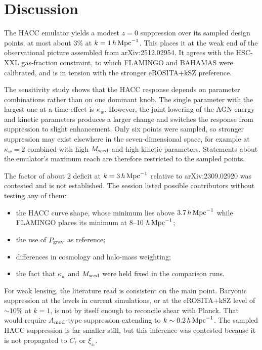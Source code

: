 \documentclass[11pt,a4paper]{article}
\begin{document}
\section{Discussion}

The HACC emulator yields a modest $z=0$ suppression over its sampled design points, at most about $3\%$ at $k=1\,h\,{\rm Mpc}^{-1}$. This places it at the weak end of the observational picture assembled from arXiv:2512.02954. It agrees with the HSC-XXL gas-fraction constraint, to which FLAMINGO and BAHAMAS were calibrated, and is in tension with the stronger eROSITA+kSZ preference.

The sensitivity study shows that the HACC response depends on parameter combinations rather than on one dominant knob. The single parameter with the largest one-at-a-time effect is $\kappa_w$. However, the joint lowering of the AGN energy and kinetic parameters produces a larger change and switches the response from suppression to slight enhancement. Only six points were sampled, so stronger suppression may exist elsewhere in the seven-dimensional space, for example at $\kappa_w=2$ combined with high $M_{\rm seed}$ and high kinetic parameters. Statements about the emulator's maximum reach are therefore restricted to the sampled points.

The factor of about 2 deficit at $k=3\,h\,{\rm Mpc}^{-1}$ relative to arXiv:2309.02920 was contested and is not established. The session listed possible contributors without testing any of them:
\begin{itemize}
\item the HACC curve shape, whose minimum lies above $3.7\,h\,{\rm Mpc}^{-1}$ while FLAMINGO places its minimum at 8--10 $h\,{\rm Mpc}^{-1}$;
\item the use of $P_{\rm grav}$ as reference;
\item differences in cosmology and halo-mass weighting;
\item the fact that $\kappa_w$ and $M_{\rm seed}$ were held fixed in the comparison runs.
\end{itemize}

For weak lensing, the literature read is consistent on the main point. Baryonic suppression at the levels in current simulations, or at the eROSITA+kSZ level of $\sim10\%$ at $k=1$, is not by itself enough to reconcile shear with Planck. That would require $A_{\rm mod}$-type suppression extending to $k\sim0.2\,h\,{\rm Mpc}^{-1}$. The sampled HACC suppression is far smaller still, but this inference was contested because it is not propagated to $C_\ell$ or $\xi_\pm$.
\end{document}
